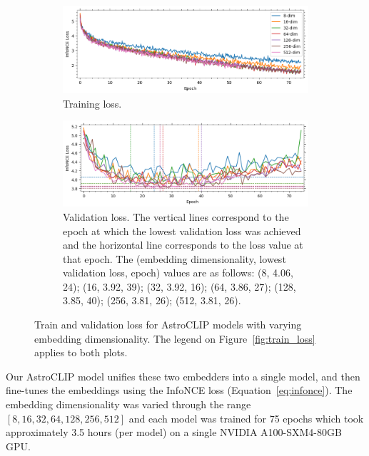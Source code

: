 \begin{figure}[t]
\centering
\begin{subfigure}{1\textwidth}
  \centering
  \includegraphics[width=1\linewidth]{figures/train_loss}
  \caption{Training loss.}
  \label{fig:train_loss}
\end{subfigure}%
\hfill
\begin{subfigure}{1\textwidth}
  \centering
  \includegraphics[width=1\linewidth]{figures/val_loss}
  \caption{Validation loss.
  The vertical lines correspond to the epoch at which the lowest validation loss was achieved and the horizontal
  line corresponds to the loss value at that epoch.
  The (embedding dimensionality, lowest validation loss, epoch) values are as follows: (8, 4.06, 24); (16, 3.92, 39);
  (32, 3.92, 16); (64, 3.86, 27); (128, 3.85, 40); (256, 3.81, 26); (512, 3.81, 26).}
  \label{fig:val_loss}
\end{subfigure}
\caption{Train and validation loss for AstroCLIP models with varying embedding dimensionality.
The legend on Figure~\eqref{fig:train_loss} applies to both plots.}
\label{fig:train_val_loss}
\end{figure}

Our AstroCLIP model unifies these two embedders into a single model, and then fine-tunes the embeddings using the InfoNCE loss
(Equation~\eqref{eq:infonce}).
The embedding dimensionality was varied through the range $[8, 16, 32, 64, 128, 256, 512]$ and each model was trained for
75 epochs which took approximately 3.5 hours (per model) on a single NVIDIA A100-SXM4-80GB GPU.

